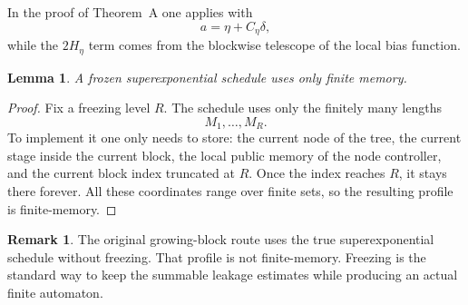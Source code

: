 \documentclass[12pt]{article}
\newtheorem{lemma}[theorem]{Lemma}
\theoremstyle{definition}
\newtheorem{remark}[theorem]{Remark}
\newcommand{\1}{\mathbf{1}}
\begin{document}
In the proof of Theorem~A one applies  with
\[
a=\eta+C_\eta\delta,
\]
while the \(2H_\eta\) term comes from the blockwise telescope of the local bias function.

\begin{lemma}
\label{lem:frozen-memory}
A frozen superexponential schedule uses only finite memory.
\end{lemma}

\begin{proof}
Fix a freezing level \(R\).  The schedule uses only the finitely many lengths
\[
M_1,\dots,M_R.
\]
To implement it one only needs to store: the current node of the tree, the current stage
inside the current block, the local public memory of the node controller, and the current
block index truncated at \(R\).  Once the index reaches \(R\), it stays there forever.
All these coordinates range over finite sets, so the resulting profile is finite-memory.
\end{proof}

\begin{remark}
The original growing-block route uses the true superexponential schedule without freezing.
That profile is not finite-memory.  Freezing is the standard way to keep the summable
leakage estimates while producing an actual finite automaton.
\end{remark}
\end{document}
